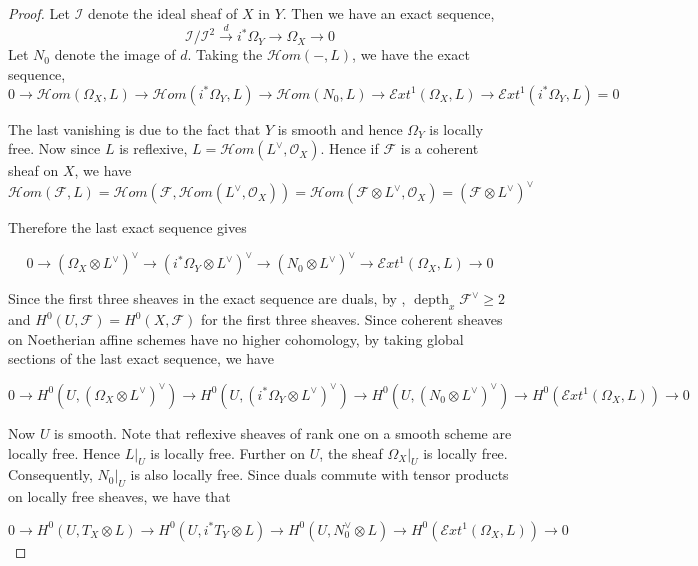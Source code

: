 \documentclass[12pt,twoside,]{amsart}
\theoremstyle{plain}
\theoremstyle{definition}
\begin{document}
\begin{proof}
    Let $\mathcal{I}$ denote the ideal sheaf of $X$ in $Y$. Then we have an exact sequence,
    $$\mathcal{I}/\mathcal{I}^2 \xrightarrow{d}  i^*\Omega_Y \to \Omega_X \to 0$$
    Let $N_0$ denote the image of $d$. Taking the $\mathcal{H}om( -, L)$, we have the exact sequence,
    $$0 \to \mathcal{H}om(\Omega_X, L) \to \mathcal{H}om(i^*\Omega_Y, L) \to \mathcal{H}om(N_0, L) \to \mathcal{E}xt^1(\Omega_X, L) \to \mathcal{E}xt^1(i^*\Omega_Y, L) = 0$$

The last vanishing is due to the fact that $Y$ is smooth and hence $\Omega_Y$ is locally free. Now since $L$ is reflexive, $L = \mathcal{H}om(L^{\vee}, \mathcal{O}_X)$. Hence if $\mathcal{F}$ is a coherent sheaf on $X$, we have 
$$\mathcal{H}om(\mathcal{F}, L) = \mathcal{H}om(\mathcal{F}, \mathcal{H}om(L^{\vee}, \mathcal{O}_X)) = \mathcal{H}om(\mathcal{F} \otimes L^{\vee}, \mathcal{O}_X) = (\mathcal{F} \otimes L^{\vee})^{\vee} $$

Therefore the last exact sequence gives

\begin{equation*}\label{exact sequence after Hom}
 0 \to (\Omega_X \otimes L^{\vee})^{\vee} \to (i^*\Omega_Y \otimes L^{\vee})^{\vee} \to (N_0 \otimes L^{\vee})^{\vee} \to \mathcal{E}xt^1(\Omega_X, L) \to 0   
\end{equation*}

Since the first three sheaves in the exact sequence are duals, by \cite[Lemma $(1)$]{schlessinger1971}, $\operatorname{depth}_x\mathcal{F}^{\vee} \geq 2$ and $H^0(U, \mathcal{F}) = H^0(X, \mathcal{F})$ for the first three sheaves. Since coherent sheaves on Noetherian affine schemes have no higher cohomology, by taking global sections of the last exact sequence, we have 

\begin{equation*}
   0 \to H^0(U,(\Omega_X \otimes L^{\vee})^{\vee}) \to H^0(U, (i^*\Omega_Y \otimes L^{\vee})^{\vee}) \to H^0(U, (N_0 \otimes L^{\vee})^{\vee}) \to H^0(\mathcal{E}xt^1(\Omega_X, L)) \to 0 
\end{equation*}

Now $U$ is smooth. Note that reflexive sheaves of rank one on a smooth scheme are locally free. Hence $L|_U$ is locally free.  Further on $U$, the sheaf $\Omega_X|_U$ is locally free. Consequently, $N_0|_U$ is also locally free. Since duals commute with tensor products on locally free sheaves, we have that

\begin{equation}\label{global sections of exact sequence of duals}
    0 \to H^0(U, T_X \otimes L) \to H^0(U, i^*T_Y\otimes L) \to H^0(U, N_0^{\vee} \otimes L) \to H^0(\mathcal{E}xt^1(\Omega_X, L)) \to 0
\end{equation}



\end{proof}
\end{document}
